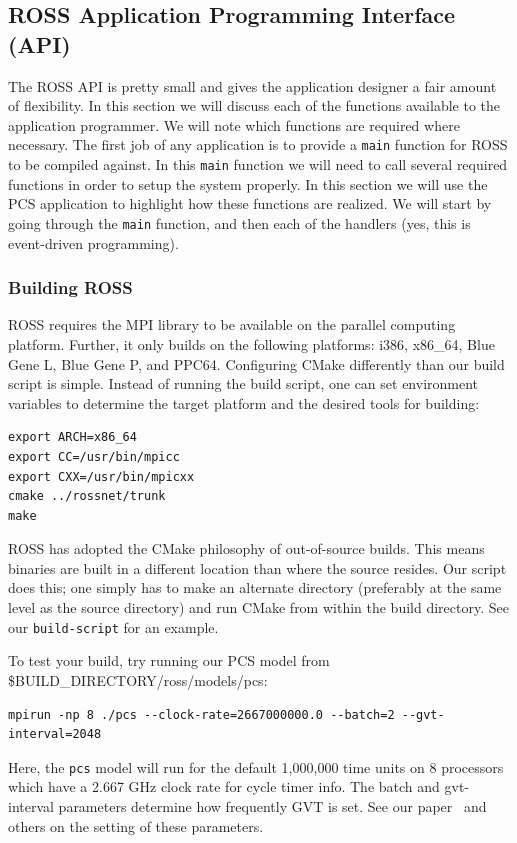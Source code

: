 \documentclass[12pt]{article}
\begin{document}
\subsection{ROSS Application Programming Interface (API)}
The ROSS API is pretty small and gives the application designer a fair
amount of flexibility.  In this section we will discuss each of the
functions available to the application programmer.  We will note which
functions are required where necessary.  The first job of any
application is to provide a {\tt main} function for ROSS to be compiled
against.  In this {\tt main} function we will need to call several required
functions in order to setup the system properly.  In this section we
will use the PCS application to highlight how these functions are
realized.  We will start by going through the {\tt main} function, and then
each of the handlers (yes, this is event-driven programming).

\subsubsection{Building ROSS}
ROSS requires the MPI library to be available on the parallel
computing platform. Further, it only builds on the following platforms:
i386, x86\_64, Blue Gene L, Blue Gene P, and PPC64.  Configuring CMake
differently than our build script is simple.  Instead of running the
build script, one can set environment variables to determine the target
platform and the desired tools for building:

\begin{verbatim}
export ARCH=x86_64
export CC=/usr/bin/mpicc
export CXX=/usr/bin/mpicxx
cmake ../rossnet/trunk
make
\end{verbatim}

ROSS has adopted the CMake philosophy of out-of-source builds.  This means
binaries are built in a different location than where the source resides.  Our
script does this; one simply has to make an alternate directory (preferably
at the same level as the source directory) and run CMake from within the
build directory.  See our {\tt build-script} for an example.

To test your build, try running our PCS model from
\${BUILD\_DIRECTORY}/ross/models/pcs:
\begin{verbatim}
mpirun -np 8 ./pcs --clock-rate=2667000000.0 --batch=2 --gvt-interval=2048
\end{verbatim}

Here, the {\tt pcs} model will run for the default 1,000,000 time units on 8
processors which have a 2.667 GHz clock rate for cycle timer info.  The batch
and gvt-interval parameters determine how frequently GVT is set. See our
paper~\cite{carothers-jpdc-2002} and others on the setting of these
parameters.
\end{document}
